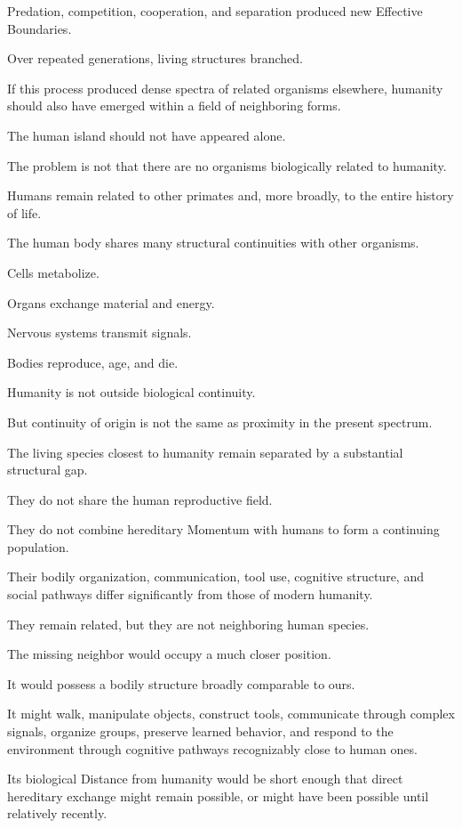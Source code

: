 Predation, competition, cooperation, and separation produced new Effective Boundaries.

Over repeated generations, living structures branched.

If this process produced dense spectra of related organisms elsewhere, humanity should also have emerged within a field of neighboring forms.

The human island should not have appeared alone.

The problem is not that there are no organisms biologically related to humanity.

Humans remain related to other primates and, more broadly, to the entire history of life.

The human body shares many structural continuities with other organisms.

Cells metabolize.

Organs exchange material and energy.

Nervous systems transmit signals.

Bodies reproduce, age, and die.

Humanity is not outside biological continuity.

But continuity of origin is not the same as proximity in the present spectrum.

The living species closest to humanity remain separated by a substantial structural gap.

They do not share the human reproductive field.

They do not combine hereditary Momentum with humans to form a continuing population.

Their bodily organization, communication, tool use, cognitive structure, and social pathways differ significantly from those of modern humanity.

They remain related, but they are not neighboring human species.

The missing neighbor would occupy a much closer position.

It would possess a bodily structure broadly comparable to ours.

It might walk, manipulate objects, construct tools, communicate through complex signals, organize groups, preserve learned behavior, and respond to the environment through cognitive pathways recognizably close to human ones.

Its biological Distance from humanity would be short enough that direct hereditary exchange might remain possible, or might have been possible until relatively recently.

